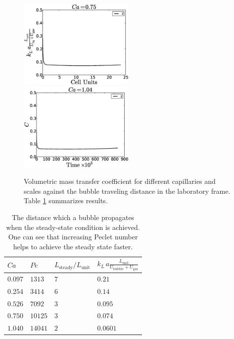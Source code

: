 \documentclass{article}
\newcommand{\vol}{k_L\,a}
\newcommand{\lunit}{L_{\mathrm{unit}}}
\newcommand{\ububble}{U_{\mathrm{bubble}}}
\newcommand{\ugas}{U_{\mathrm{gas}}}
\newcommand{\volnondim}{\vol \frac{\lunit}{\ububble+\ugas}}
\begin{document}
\begin{figure}[htb!]
\includegraphics[width=0.5\textwidth]{Figures/aver_conc_scale_ca05.eps}\\
\includegraphics[width=0.5\textwidth]{Figures/aver_conc_scale_ca14.eps}
\caption{Volumetric mass transfer coefficient for different capillaries and scales against the
bubble traveling distance in the laboratory frame. Table \ref{table:steady:state:average}
summarizes results.\label{fig:aver:conc:different:capillaries}}
\end{figure}
\begin{table}[htb!]
\begin{tabularx}{\textwidth}{|X|X|X|X|}
\hline
$Ca$    &$Pe$     &$L_{\mathrm{steady}}/\lunit$& $\volnondim$ \\
\hline
$0.097$ &$1313$  &$7$&$0.21$  \\ 
$0.254$ &$3414$  &$6$&$0.14$  \\ 
$0.526$ &$7092$  &$3$&$0.095$ \\
$0.750$ &$10125$ &$3$&$0.074$ \\
$1.040$ &$14041$ &$2$&$0.0601$\\
\hline
\end{tabularx}
\caption{The distance which a bubble propagates when the
steady-state condition is achieved. One can see that increasing
Peclet number helps to achieve the steady state faster.\label{table:steady:state:average}}
\end{table}
\end{document}
